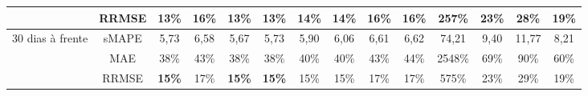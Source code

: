 \begin{landscape}
\begin{table}[H]
\begin{tabular}{@{}cccccccccccccc@{}}
		& RRMSE    & \textbf{13\%} & 16\%          & \textbf{13\%} & \textbf{13\%} & \textbf{14\%} & \textbf{14\%} & 16\%          & 16\%          & 257\%         & 23\% & 28\%  & 19\% \\ \midrule
		\multirow{3}{*}{30 dias à frente} & sMAPE    & 5,73          & 6,58          & 5,67          & 5,73          & 5,90          & 6,06          & 6,61          & 6,62          & 74,21         & 9,40 & 11,77 & 8,21 \\
		& MAE      & 38\%          & 43\%          & 38\%          & 38\%          & 40\%          & 40\%          & 43\%          & 44\%          & 2548\%        & 69\% & 90\%  & 60\% \\
		& RRMSE    & \textbf{15\%} & 17\%          & \textbf{15\%} & \textbf{15\%} & 15\%          & 15\%          & 17\%          & 17\%          & 575\%         & 23\% & 29\%  & 19\% \\ \cmidrule(l){1-14} 
	\end{tabular}
	
\end{table}

\newpage


\end{landscape}
